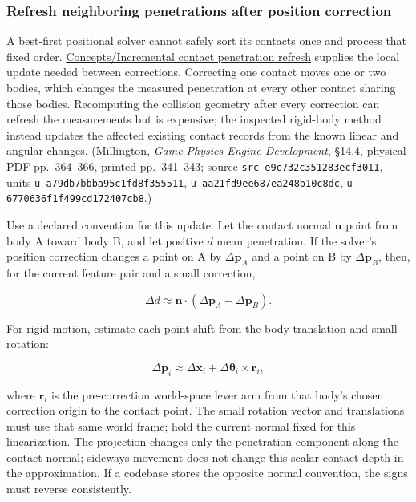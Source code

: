 \subsubsection{Refresh neighboring penetrations after position correction}\label{06-engine-ii-ch046-refresh-neighboring-penetrations-after-position-correction}

\hypertarget{06-engine-ii-ch046-refresh-neighboring-penetrations-after-position-correction}{}

A best-first positional solver cannot safely sort its contacts once and process that fixed order. \hyperref[appendix-f682275acbdf]{Concepts/Incremental contact penetration refresh} supplies the local update needed between corrections. Correcting one contact moves one or two bodies, which changes the measured penetration at every other contact sharing those bodies. Recomputing the collision geometry after every correction can refresh the measurements but is expensive; the inspected rigid-body method instead updates the affected existing contact records from the known linear and angular changes. (Millington, \emph{Game Physics Engine Development}, §14.4, physical PDF pp.~364--366, printed pp.~341--343; source \texttt{src-e9c732c351283ecf3011}, units \texttt{u-a79db7bbba95c1fd8f355511}, \texttt{u-aa21fd9ee687ea248b10c8dc}, \texttt{u-6770636f1f499cd172407cb8}.)

Use a declared convention for this update. Let the contact normal \(\mathbf n\) point from body A toward body B, and let positive \(d\) mean penetration. If the solver's position correction changes a point on A by \(\Delta\mathbf p_A\) and a point on B by \(\Delta\mathbf p_B\), then, for the current feature pair and a small correction,

\[
\Delta d\approx \mathbf n\cdot(\Delta\mathbf p_A-\Delta\mathbf p_B).
\]

For rigid motion, estimate each point shift from the body translation and small rotation:

\[
\Delta\mathbf p_i\approx \Delta\mathbf x_i+\Delta\boldsymbol\theta_i\times\mathbf r_i,
\]

where \(\mathbf r_i\) is the pre-correction world-space lever arm from that body's chosen correction origin to the contact point. The small rotation vector and translations must use that same world frame; hold the current normal fixed for this linearization. The projection changes only the penetration component along the contact normal; sideways movement does not change this scalar contact depth in the approximation. If a codebase stores the opposite normal convention, the signs must reverse consistently.

